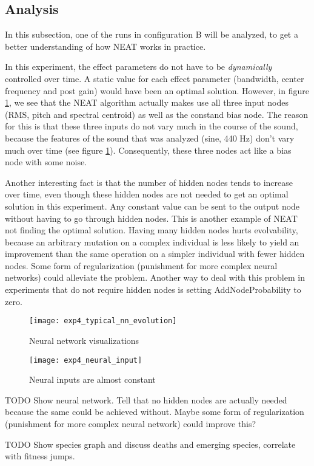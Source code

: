 \subsection{Analysis}

In this subsection, one of the runs in configuration B will be analyzed, to get a better understanding of how NEAT works in practice.

In this experiment, the effect parameters do not have to be \textit{dynamically} controlled over time. A static value for each effect parameter (bandwidth, center frequency and post gain) would have been an optimal solution. However, in figure \ref{fig:exp4_typical_nn_evolution}, we see that the NEAT algorithm actually makes use all three input nodes (RMS, pitch and spectral centroid) as well as the constand bias node. The reason for this is that these three inputs do not vary much in the course of the sound, because the features of the sound that was analyzed (sine, 440 Hz) don't vary much over time (see figure \ref{fig:exp4_typical_nn_evolution}). Consequently, these three nodes act like a bias node with some noise.

Another interesting fact is that the number of hidden nodes tends to increase over time, even though these hidden nodes are not needed to get an optimal solution in this experiment. Any constant value can be sent to the output node without having to go through hidden nodes. This is another example of NEAT not finding the optimal solution. Having many hidden nodes hurts evolvability, because an arbitrary mutation on a complex individual is less likely to yield an improvement than the same operation on a simpler individual with fewer hidden nodes. Some form of regularization (punishment for more complex neural networks) could alleviate the problem. Another way to deal with this problem in experiments that do not require hidden nodes is setting AddNodeProbability to zero.

\begin{figure}[h]
    \centering
    \texttt{[image: exp4\_typical\_nn\_evolution]}
    \caption{Neural network visualizations}
    \label{fig:exp4_typical_nn_evolution}
\end{figure}

\begin{figure}[h]
    \centering
    \texttt{[image: exp4\_neural\_input]}
    \caption{Neural inputs are almost constant}
    \label{fig:exp4_neural_input}
\end{figure}

TODO Show neural network. Tell that no hidden nodes are actually needed because the same could be achieved without. Maybe some form of regularization (punishment for more complex neural network) could improve this?

TODO Show species graph and discuss deaths and emerging species, correlate with fitness jumps.
